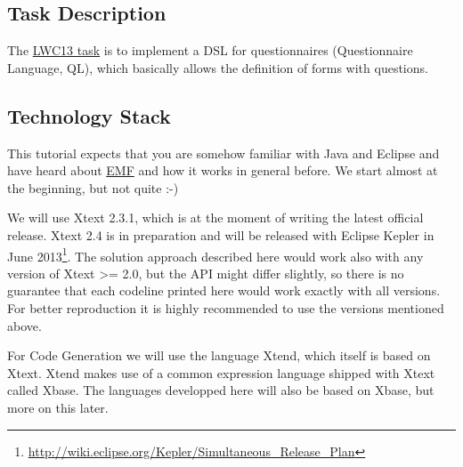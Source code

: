 \subsection{Task Description}
The {\href{http://www.languageworkbenches.net/images/5/53/Ql.pdf}{LWC13 task}}
is to implement a DSL for questionnaires (Questionnaire Language, QL), which
basically allows the definition of forms with questions.


\subsection{Technology Stack}
This tutorial expects that you are somehow familiar with Java and Eclipse and
have heard about \url{EMF} and how it works in general before. We start almost at the
beginning, but not quite :-) 

We will use Xtext 2.3.1, which is at the moment of writing the latest official
release.
Xtext 2.4 is in preparation and will be released with Eclipse Kepler in June
2013\footnote{\url{http://wiki.eclipse.org/Kepler/Simultaneous_Release_Plan}}.
The solution approach described here would work also with any version
of Xtext >= 2.0, but the API might differ slightly, so there is no guarantee
that each codeline printed here would work exactly with all versions. For better
reproduction it is highly recommended to use the versions mentioned above.

For Code Generation we will use the language Xtend, which itself is based on
Xtext. Xtend makes use of a common expression language shipped with Xtext called
Xbase. The languages developped here will also be based on Xbase, but more on
this later.
